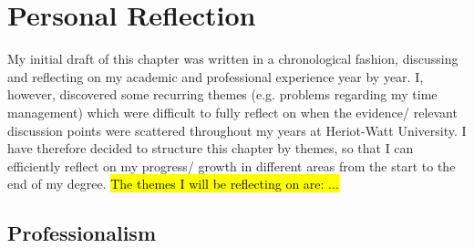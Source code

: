 \chapter{Personal Reflection} %

\label{Chapter4} %



My initial draft of this chapter was written in a chronological fashion, discussing and reflecting on my academic and professional experience year by year.
I, however, discovered some recurring themes (e.g. problems regarding my time management) which were difficult to fully reflect on when the evidence/ relevant discussion points were scattered throughout my years at Heriot-Watt University.
I have therefore decided to structure this chapter by themes, so that I can efficiently reflect on my progress/ growth in different areas from the start to the end of my degree.
\hl{The themes I will be reflecting on are: ...}



\section{Professionalism}

